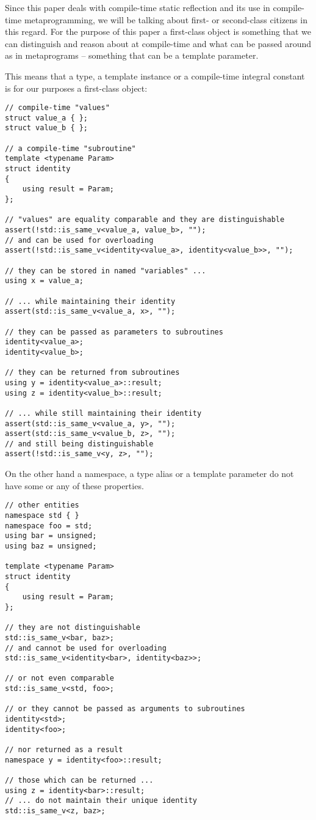 Since this paper deals with compile-time static reflection and its use
in compile-time metaprogramming, we will be talking about first- or second-class
citizens in this regard. 
For the purpose of this paper a first-class object is something that
we can distinguish and reason about at compile-time and what can be passed around
as  in metaprograms -- something that can be a template parameter.

This means that a type, a template instance or a compile-time integral constant
is for our purposes a first-class object:

\begin{verbatim}
// compile-time "values"
struct value_a { };
struct value_b { };

// a compile-time "subroutine"
template <typename Param>
struct identity
{
	using result = Param;
};

// "values" are equality comparable and they are distinguishable
assert(!std::is_same_v<value_a, value_b>, "");
// and can be used for overloading
assert(!std::is_same_v<identity<value_a>, identity<value_b>>, "");

// they can be stored in named "variables" ...
using x = value_a;

// ... while maintaining their identity
assert(std::is_same_v<value_a, x>, "");

// they can be passed as parameters to subroutines
identity<value_a>;
identity<value_b>;

// they can be returned from subroutines
using y = identity<value_a>::result;
using z = identity<value_b>::result;

// ... while still maintaining their identity
assert(std::is_same_v<value_a, y>, "");
assert(std::is_same_v<value_b, z>, "");
// and still being distinguishable
assert(!std::is_same_v<y, z>, "");
\end{verbatim}


On the other hand a namespace, a type alias or a template parameter do not have
some or any of these properties.

\begin{verbatim}
// other entities
namespace std { }
namespace foo = std;
using bar = unsigned;
using baz = unsigned;

template <typename Param>
struct identity
{
	using result = Param;
};

// they are not distinguishable
std::is_same_v<bar, baz>;
// and cannot be used for overloading
std::is_same_v<identity<bar>, identity<baz>>;

// or not even comparable
std::is_same_v<std, foo>;

// or they cannot be passed as arguments to subroutines
identity<std>;
identity<foo>;

// nor returned as a result
namespace y = identity<foo>::result;

// those which can be returned ...
using z = identity<bar>::result;
// ... do not maintain their unique identity
std::is_same_v<z, baz>;
\end{verbatim}


